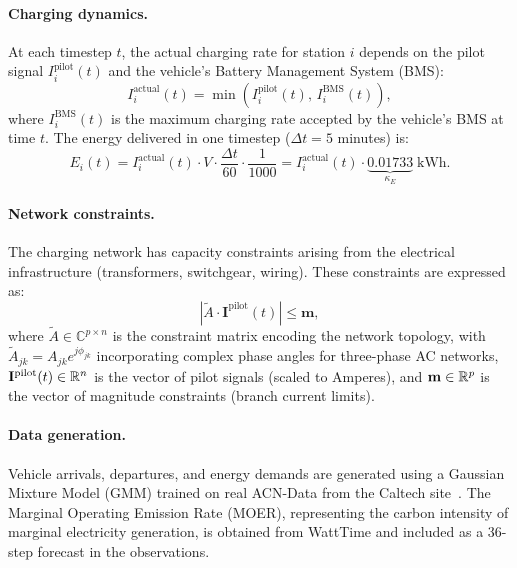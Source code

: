\paragraph{Charging dynamics.} At each timestep $t$, the actual charging rate for station $i$ depends on the pilot signal $I_i^{\text{pilot}}(t)$ and the vehicle's Battery Management System (BMS):
\begin{equation}
    I_i^{\text{actual}}(t) = \min\!\left(I_i^{\text{pilot}}(t), \, I_i^{\text{BMS}}(t)\right),
    \label{eq:ev_bms}
\end{equation}
where $I_i^{\text{BMS}}(t)$ is the maximum charging rate accepted by the vehicle's BMS at time $t$. The energy delivered in one timestep ($\Delta t = 5$ minutes) is:
\begin{equation}
    E_i(t) = I_i^{\text{actual}}(t) \cdot V \cdot \frac{\Delta t}{60} \cdot \frac{1}{1000} = I_i^{\text{actual}}(t) \cdot \underbrace{0.01733}_{\kappa_E} \; \text{kWh}.
    \label{eq:ev_energy}
\end{equation}

\paragraph{Network constraints.} The charging network has capacity constraints arising from the electrical infrastructure (transformers, switchgear, wiring). These constraints are expressed as:
\begin{equation}
    \left|\tilde{A} \cdot \mathbf{I}^{\text{pilot}}(t)\right| \leq \mathbf{m},
    \label{eq:ev_network}
\end{equation}
where $\tilde{A} \in \mathbb{C}^{p \times n}$ is the constraint matrix encoding the network topology, with $\tilde{A}_{jk} = A_{jk} e^{j\phi_{jk}}$ incorporating complex phase angles for three-phase AC networks, $\mathbf{I}^{\text{pilot}}(t) \in \mathbb{R}^n$ is the vector of pilot signals (scaled to Amperes), and $\mathbf{m} \in \mathbb{R}^p$ is the vector of magnitude constraints (branch current limits).

\paragraph{Data generation.} Vehicle arrivals, departures, and energy demands are generated using a Gaussian Mixture Model (GMM) trained on real ACN-Data from the Caltech site~\citep{lee2019acndata}. The Marginal Operating Emission Rate (MOER), representing the carbon intensity of marginal electricity generation, is obtained from WattTime and included as a 36-step forecast in the observations.

